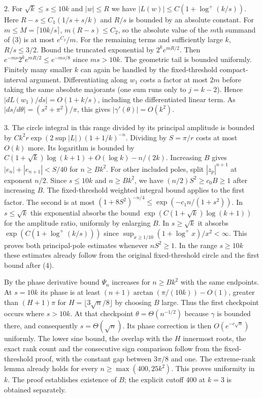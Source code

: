 \documentclass[11pt]{article}
\begin{document}
2. For $\sqrt k\le s\le10k$ and $|w|\le R$ we have $|L(w)|\le C(1+\log^+(k/s))$. Here $R-s\le C_1(1/s+s/k)$ and $R/s$ is bounded by an absolute constant. For $m\le M=\lceil 10k/s\rceil$, $m(R-s)\le C_2$, so the absolute value of the $m$th summand of (3) is at most $e^{C_2}/m$. For the remaining terms and sufficiently large $k$, $R/s\le3/2$. Bound the truncated exponential by $2^k e^{mR/2}$. Then $e^{-ms}2^ke^{mR/2}\le e^{-ms/8}$ since $ms>10k$. The geometric tail is bounded uniformly. Finitely many smaller $k$ can again be handled by the fixed-threshold compact-interval argument. Differentiating along $w_1$ costs a factor at most $2m$ before taking the same absolute majorants (one sum runs only to $j=k-2$). Hence $|dL(w_1)/ds|=O(1+k/s)$, including the differentiated linear term. As $|ds/d\theta|=(s^2+\pi^2)/\pi$, this gives $|\gamma'(\theta)|=O(k^2)$.

3. The circle integral in this range divided by its principal amplitude is bounded by $C k^2 r\exp(2\sup |L|)(1+1/k)^{-n}$. Dividing by $S=\pi/r$ costs at most $O(k)$ more. Its logarithm is bounded by $C(1+\sqrt k)\log(k+1)+O(\log k)-n/(2k)$. Increasing $B$ gives $|e_n|+|e_{n+1}|<S/40$ for $n\ge Bk^2$. For other included poles, split $|z_p|^{n+1}$ at exponent $n/2$. Since $s\le10k$ and $n\ge Bk^2$, we have $(n/2)S^2\ge c_0 B\ge1$ after increasing $B$. The fixed-threshold weighted integral bound applies to the first factor. The second is at most $(1+8S^2)^{-n/4}\le\exp(-c_1 n/(1+s^2))$. In $s\le\sqrt{k}$ this exponential absorbs the bound $\exp(C(1+\sqrt k)\log(k+1))$ for the amplitude ratio, uniformly by enlarging $B$. In $s\ge\sqrt k$ it absorbs $\exp(C(1+\log^+(k/s)))$ since $\sup_{x\ge1/10}(1+\log^+ x)/x^2<\infty$. This proves both principal-pole estimates whenever $nS^2\ge1$. In the range $s\ge10k$ these estimates already follow from the original fixed-threshold circle and the first bound after (4).

By the phase derivative bound $\Psi_n$ increases for $n\ge Bk^2$ with the same endpoints. At $s=10k$ its phase is at least $(n+1)\arctan(\pi/(10k))-O(1)$, greater than $(H+1)\pi$ for $H=\lfloor3\sqrt n/8\rfloor$ by choosing $B$ large. Thus the first checkpoint occurs where $s>10k$. At that checkpoint $\theta=\Theta(n^{-1/2})$ because $\gamma$ is bounded there, and consequently $s=\Theta(\sqrt n)$. Its phase correction is then $O(e^{-c\sqrt n})$ uniformly. The lower sine bound, the overlap with the $H$ innermost roots, the exact rank count and the consecutive sign comparison follow from the fixed-threshold proof, with the constant gap between $3\pi/8$ and one. The extreme-rank lemma already holds for every $n\ge\max(400,25k^2)$. This proves uniformity in $k$. The proof establishes existence of $B$; the explicit cutoff 400 at $k=3$ is obtained separately.
\end{document}
